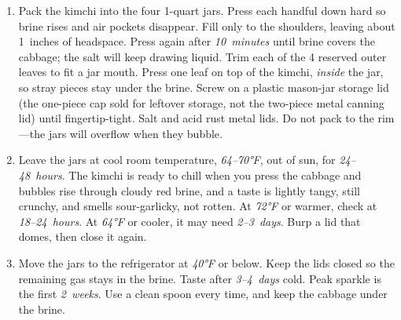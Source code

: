 \documentclass[11pt,letterpaper]{article}
\begin{document}
\begin{enumerate}
    \item Pack the kimchi into the four 1-quart jars. Press each handful down hard so brine rises and air pockets disappear. Fill only to the shoulders, leaving about 1~inches of headspace. Press again after \textit{10~minutes} until brine covers the cabbage; the salt will keep drawing liquid. Trim each of the 4 reserved outer leaves to fit a jar mouth. Press one leaf on top of the kimchi, \emph{inside} the jar, so stray pieces stay under the brine. Screw on a plastic mason-jar storage lid (the one-piece cap sold for leftover storage, not the two-piece metal canning lid) until fingertip-tight. Salt and acid rust metal lids. Do not pack to the rim---the jars will overflow when they bubble.

    \item Leave the jars at cool room temperature, \textit{64--70°F}, out of sun, for \textit{24--48~hours}. The kimchi is ready to chill when you press the cabbage and bubbles rise through cloudy red brine, and a taste is lightly tangy, still crunchy, and smells sour-garlicky, not rotten. At \textit{72°F} or warmer, check at \textit{18--24~hours}. At \textit{64°F} or cooler, it may need \textit{2--3~days}. Burp a lid that domes, then close it again.

    \item Move the jars to the refrigerator at \textit{40°F} or below. Keep the lids closed so the remaining gas stays in the brine. Taste after \textit{3--4~days} cold. Peak sparkle is the first \textit{2~weeks}. Use a clean spoon every time, and keep the cabbage under the brine.
\end{enumerate}
\end{document}
